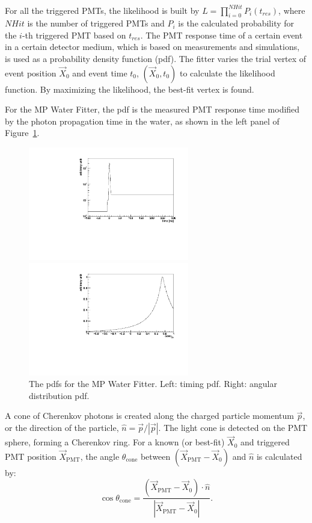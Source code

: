 \documentclass[preprint,12pt]{elsarticle}
\numberwithin{equation}{section}
\begin{document}
For all the triggered PMTs, the likelihood is built by $L=\prod^{NHit}_{i=0}P_i(t_{res})$, where $NHit$ is the number of triggered PMTs and $P_i$ is the calculated probability for the $i$-th triggered PMT based on $t_{res}$. The PMT response time of a certain event in a certain detector medium, which is based on measurements and simulations, is used as a probability density function (pdf). The fitter varies the trial vertex of event position $\vec{X}_{0}$ and event time $t_0$, $(\vec{X}_{0},t_0)$ to calculate the likelihood function. By maximizing the likelihood, the best-fit vertex is found.

For the MP Water Fitter, the pdf is the measured PMT response time modified by the photon propagation time in the water, as shown in the left panel of Figure~\ref{mpwpdf}.

\begin{figure}[htbp]
	\centering
	\begin{minipage}[t]{0.48\textwidth}
		\centering
		\includegraphics[width=7cm]{MPW_timingPDF.pdf}
	\end{minipage}
	\begin{minipage}[t]{0.48\textwidth}
		\centering
		\includegraphics[width=7cm]{MPW_angularPDF.pdf}
	\end{minipage}
	\caption{The pdfs for the MP Water Fitter. Left: timing pdf. Right: angular distribution pdf.}
	\label{mpwpdf}
\end{figure}

A cone of Cherenkov photons is created along the charged particle momentum $\vec{p}$, or the direction of the particle, $\hat n = \vec p/|\vec p|$. The light cone is detected on the PMT sphere, forming a Cherenkov ring. For a known (or best-fit) $\vec{X}_{0}$ and triggered PMT position $\vec{X}_\mathrm{PMT}$, the angle $\theta_\mathrm{cone}$ between $(\vec{X}_\mathrm{PMT}-\vec{X}_{0})$ and $\hat n$ is calculated by:
\[\cos\theta_\mathrm{cone} = \frac{(\vec{X}_\mathrm{PMT}-\vec{X}_{0})\cdot \hat{n}}{|\vec{X}_\mathrm{PMT}-\vec{X}_{0}|}.\]
\end{document}

